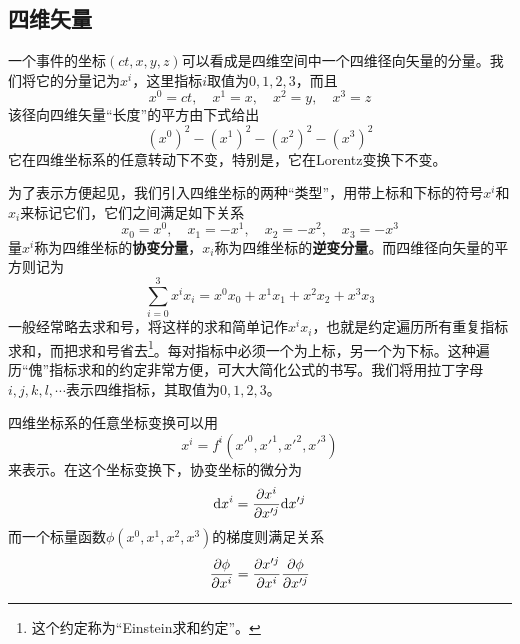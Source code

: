 \subsection{四维矢量}

一个事件的坐标$(ct,x,y,z)$可以看成是四维空间中一个四维径向矢量的分量。我们将它的分量记为$x^i$，这里指标$i$取值为$0,1,2,3$，而且
\begin{equation*}
	x^0 = ct,\quad x^1 = x,\quad x^2 = y,\quad x^3 = z
\end{equation*}
该径向四维矢量“长度”的平方由下式给出
\begin{equation*}
	(x^0)^2-(x^1)^2-(x^2)^2-(x^3)^2
\end{equation*}
它在四维坐标系的任意转动下不变，特别是，它在Lorentz变换下不变。

为了表示方便起见，我们引入四维坐标的两种“类型”，用带上标和下标的符号$x^i$和$x_i$来标记它们，它们之间满足如下关系
\begin{equation}
	x_0 = x^0,\quad x_1 = -x^1,\quad x_2 = -x^2,\quad x_3 = -x^3
	\label{chapter1:四维逆变坐标}
\end{equation}
量$x^i$称为四维坐标的{\bf 协变分量}，$x_i$称为四维坐标的{\bf 逆变分量}。而四维径向矢量的平方则记为
\begin{equation*}
	\sum_{i=0}^3 x^ix_i = x^0x_0+x^1x_1+x^2x_2+x^3x_3
\end{equation*}
一般经常略去求和号，将这样的求和简单记作$x^ix_i$，也就是约定遍历所有重复指标求和，而把求和号省去\footnote{这个约定称为“Einstein求和约定”。}。每对指标中必须一个为上标，另一个为下标。这种遍历“傀”指标求和的约定非常方便，可大大简化公式的书写。我们将用拉丁字母$i,j,k,l,\cdots$表示四维指标，其取值为$0,1,2,3$。

四维坐标系的任意坐标变换可以用
\begin{equation}
	x^i = f^i(x'^0,x'^1,x'^2,x'^3)
\end{equation}
来表示。在这个坐标变换下，协变坐标的微分为
\begin{equation}
	\mathrm{d} x^i = \frac{\partial x^i}{\partial x'^j} \mathrm{d} x'^j
	\label{chapter1:协变坐标微分的变换式}
\end{equation}
而一个标量函数$\phi(x^0,x^1,x^2,x^3)$的梯度则满足关系
\begin{equation}
	\frac{\partial \phi}{\partial x^i} = \frac{\partial x'^j}{\partial x^i} \frac{\partial \phi}{\partial x'^j}
	\label{chapter1:标量函数梯度的变换式}
\end{equation}

